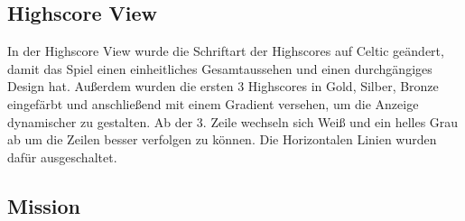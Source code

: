 \documentclass{article}
\begin{document}
\subsection{Highscore View}
In der Highscore View wurde die Schriftart der Highscores auf Celtic geändert, damit das Spiel einen einheitliches Gesamtaussehen und einen durchgängiges Design hat. Außerdem wurden die ersten 3 Highscores in Gold, Silber, Bronze eingefärbt und anschließend mit einem Gradient versehen, um die Anzeige dynamischer zu gestalten. Ab der 3. Zeile wechseln sich Weiß und ein helles Grau ab um die Zeilen besser verfolgen zu können. Die Horizontalen Linien wurden dafür ausgeschaltet.

\subsection{Mission}
\end{document}

